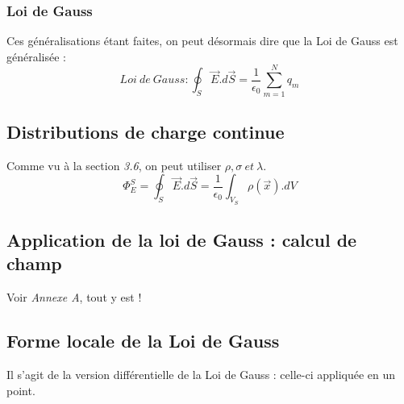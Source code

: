 \documentclass	[11pt, a4paper, openany]{book}
\begin{document}
\subsubsection{Loi de Gauss}
Ces généralisations étant faites, on peut désormais dire que la Loi de Gauss est généralisée :
\begin{equation}
	Loi\ de\ Gauss : \oint_S \vec{E}.d\vec{S} = \dfrac{1}{\epsilon_0}\sum_{m=1}^N q_m
\end{equation}

\subsection{Distributions de charge continue}
Comme vu à la section \textit{3.6}, on peut utiliser $\rho, \sigma\ et\ \lambda$.
\begin{equation}
	\Phi^S_E = \oint_S \vec{E}.d\vec{S} = \frac{1}{\epsilon_0}\int_{V_S}\rho(\vec x).dV
\end{equation}

\subsection{Application de la loi de Gauss : calcul de champ}
Voir \textit{Annexe A}, tout y est !
\newpage
\subsection{Forme locale de la Loi de Gauss}
Il s'agit de la version différentielle de la Loi de Gauss : celle-ci appliquée en un point.
\end{document}
